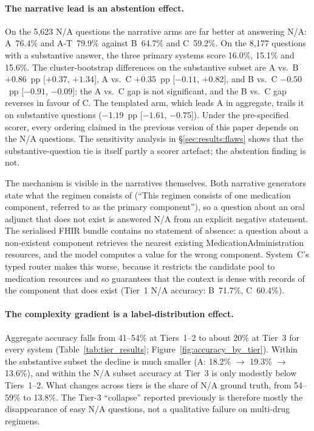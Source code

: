 \paragraph{The narrative lead is an abstention effect.}
On the 5,623 N/A questions the narrative arms are far better at answering N/A: A~76.4\%
and A-T~79.9\% against B~64.7\% and C~59.2\%.  On the 8,177 questions with a substantive
answer, the three primary systems score 16.0\%, 15.1\% and 15.6\%.  The cluster-bootstrap
differences on the substantive subset are A vs.\ B $+0.86$~pp [$+0.37$, $+1.34$],
A vs.\ C $+0.35$~pp [$-0.11$, $+0.82$], and B vs.\ C $-0.50$~pp [$-0.91$, $-0.09$]: the
A vs.\ C gap is not significant, and the B vs.\ C gap reverses in favour of C.  The
templated arm, which leads A in aggregate, trails it on substantive questions
($-1.19$~pp [$-1.61$, $-0.75$]).  Under the pre-specified scorer, every ordering claimed
in the previous version of this paper depends on the N/A questions.  The sensitivity
analysis in \S\ref{sec:results:flaws} shows that the substantive-question tie is itself
partly a scorer artefact; the abstention finding is not.

The mechanism is visible in the narratives themselves.  Both narrative generators state
what the regimen consists of (``This regimen consists of one medication component,
referred to as the primary component''), so a question about an oral adjunct that does not
exist is answered N/A from an explicit negative statement.  The serialised FHIR bundle
contains no statement of absence: a question about a non-existent component retrieves the
nearest existing MedicationAdministration resources, and the model computes a value for
the wrong component.  System~C's typed router makes this worse, because it restricts the
candidate pool to medication resources and so guarantees that the context is dense with
records of the component that does exist (Tier~1 N/A accuracy: B~71.7\%, C~60.4\%).

\paragraph{The complexity gradient is a label-distribution effect.}
Aggregate accuracy falls from 41--54\% at Tiers~1--2 to about 20\% at Tier~3 for every
system (Table~\ref{tab:tier_results}; Figure~\ref{fig:accuracy_by_tier}).  Within the
substantive subset the decline is much smaller (A: 18.2\% $\rightarrow$ 19.3\%
$\rightarrow$ 13.6\%), and within the N/A subset accuracy at Tier~3 is only modestly
below Tiers~1--2.  What changes across tiers is the share of N/A ground truth, from
54--59\% to 13.8\%.  The Tier-3 ``collapse'' reported previously is therefore mostly
the disappearance of easy N/A questions, not a qualitative failure on multi-drug regimens.

